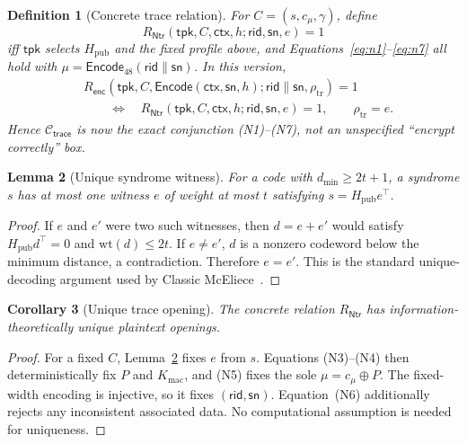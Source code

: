 \documentclass[11pt]{article}
\newtheorem{definition}{Definition}[section]
\newtheorem{lemma}[definition]{Lemma}
\newtheorem{corollary}[definition]{Corollary}
\newcommand{\rid}{\mathsf{rid}}
\newcommand{\sn}{\mathsf{sn}}
\newcommand{\ctx}{\mathsf{ctx}}
\begin{document}
\begin{definition}[Concrete trace relation]\label{def:ntr}
For $C=(s,c_\mu,\gamma)$, define
\[
 R_{\mathsf{Ntr}}(\mathsf{tpk},C,\ctx,h;
                    \rid,\sn,e)=1
\]
iff $\mathsf{tpk}$ selects $H_{\mathrm{pub}}$ and the fixed profile above, and
Equations~\eqref{eq:n1}--\eqref{eq:n7} all hold with
$\mu=\mathsf{Encode}_{48}(\rid\|\sn)$.  In this version,
\[
 \begin{aligned}
 &R_{\mathsf{enc}}(\mathsf{tpk},C,
     \mathsf{Encode}(\ctx,\sn,h);\rid\|\sn,\rho_{\mathrm{tr}})=1\\
 &\qquad\Longleftrightarrow\quad
 R_{\mathsf{Ntr}}(\mathsf{tpk},C,\ctx,h;\rid,\sn,e)=1,
 \qquad \rho_{\mathrm{tr}}=e.
 \end{aligned}
\]
Hence $\mathcal C_{\mathsf{trace}}$ is now the exact conjunction (N1)--(N7),
not an unspecified ``encrypt correctly'' box.
\end{definition}

\begin{lemma}[Unique syndrome witness]\label{lem:unique-error}
For a code with $d_{\min}\geq2t+1$, a syndrome $s$ has at most one witness
$e$ of weight at most $t$ satisfying $s=H_{\mathrm{pub}}e^\top$.
\end{lemma}

\begin{proof}
If $e$ and $e'$ were two such witnesses, then
$d=e+e'$ would satisfy $H_{\mathrm{pub}}d^\top=0$ and
$\mathrm{wt}(d)\leq2t$.  If $e\neq e'$, $d$ is a nonzero codeword below the
minimum distance, a contradiction.  Therefore $e=e'$.  This is the standard
unique-decoding argument used by Classic McEliece~\cite{classic-mceliece-spec}.
\end{proof}

\begin{corollary}[Unique trace opening]\label{cor:unique-trace}
The concrete relation $R_{\mathsf{Ntr}}$ has information-theoretically unique
plaintext openings.
\end{corollary}

\begin{proof}
For a fixed $C$, Lemma~\ref{lem:unique-error} fixes $e$ from $s$.  Equations
(N3)--(N4) then deterministically fix $P$ and $K_{\mathrm{mac}}$, and (N5)
fixes the sole $\mu=c_\mu\oplus P$.  The fixed-width encoding is injective, so
it fixes $(\rid,\sn)$.  Equation~(N6) additionally rejects any inconsistent
associated data.  No computational assumption is needed for uniqueness.
\end{proof}
\end{document}
